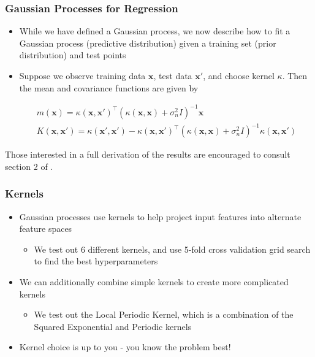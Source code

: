\documentclass[pdf]{beamer}
\newcommand{\bx}{\boldsymbol{x}}
\begin{document}
\begin{frame}
  \frametitle{Gaussian Processes for Regression}

  \begin{itemize}
    \item While we have defined a Gaussian process, we now describe how to fit a Gaussian process (predictive
      distribution) given a training set (prior distribution) and test points
    \item Suppose we observe training data $\bx$, test data $\bx'$, and choose kernel $\kappa$. Then the mean and
      covariance functions are given by 

      \begin{gather*}
        m(\boldsymbol{x})=\kappa(\bx, \bx')^\top \left(\kappa(\bx, \bx) + \sigma_{n}^{2} I\right)^{-1}\bx \\
        K(\boldsymbol{x},\boldsymbol{x'}) = \kappa(\bx', \bx') - \kappa(\bx, \bx')^{\top}\left(\kappa(\bx, \bx) +
        \sigma_{n}^{2}I\right)^{-1}\kappa(\bx, \bx')
      \end{gather*}
  \end{itemize}

  Those interested in a full derivation of the results are encouraged to consult section 2 of
  \cite{rasmussen_gaussian_2006}.
\end{frame}

\begin{frame}
  \frametitle{Kernels}
  \begin{itemize}
    \item Gaussian processes use kernels to help project input features into alternate feature
      spaces\cite{duvenaud_automatic_2014}
      \begin{itemize}
        \item We test out 6 different kernels, and use 5-fold cross validation grid search to find the best
          hyperparameters
      \end{itemize}
    \item We can additionally combine simple kernels to create more complicated kernels
    \begin{itemize}
      \item We test out the Local Periodic Kernel, which is a combination of the Squared Exponential and Periodic
        kernels
    \end{itemize}
    \item Kernel choice is up to you - you know the problem best!
  \end{itemize}
\end{frame}
\end{document}
